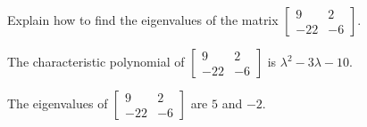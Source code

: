 
\begin{exerciseStatement}


Explain how to find the eigenvalues of the matrix \( \left[\begin{array}{cc}
9 & 2 \\
-22 & -6
\end{array}\right] \).


\end{exerciseStatement}
    
\begin{exerciseAnswer} 


The characteristic polynomial of \( \left[\begin{array}{cc}
9 & 2 \\
-22 & -6
\end{array}\right] \) is \( \lambda^{2} - 3 \lambda - 10 \).



The eigenvalues of \( \left[\begin{array}{cc}
9 & 2 \\
-22 & -6
\end{array}\right] \) are \( 5 \) and \( -2 \).


\end{exerciseAnswer}
    
